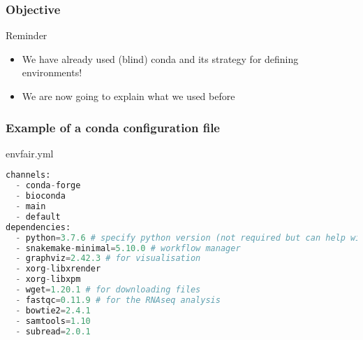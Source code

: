 \begin{frame}[containsverbatim]
\frametitle{Objective}
\begin{exampleblock}{Reminder}
\begin{itemize}
    \item We have already used (blind) conda and its strategy for defining environments!
    \item We are now going to explain what we used before
\end{itemize}
\end{exampleblock}
\end{frame}
\begin{frame}[containsverbatim]
\frametitle{Example of a conda configuration file}
\begin{exampleblock}{envfair.yml}
\begin{lstlisting}[language=python]
channels:
  - conda-forge
  - bioconda
  - main
  - default
dependencies:
  - python=3.7.6 # specify python version (not required but can help with downstream conflicts)
  - snakemake-minimal=5.10.0 # workflow manager
  - graphviz=2.42.3 # for visualisation
  - xorg-libxrender
  - xorg-libxpm
  - wget=1.20.1 # for downloading files
  - fastqc=0.11.9 # for the RNAseq analysis
  - bowtie2=2.4.1
  - samtools=1.10
  - subread=2.0.1
\end{lstlisting}
\end{exampleblock}
\end{frame}

